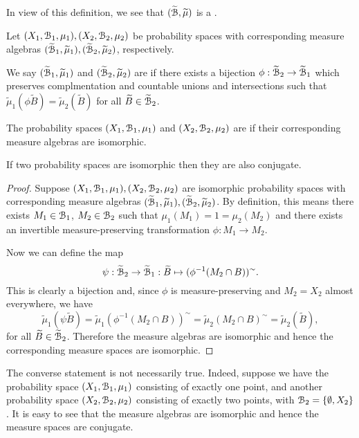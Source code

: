 In view of this definition, we see that $(\widetilde{\mathcal{B}}, \widetilde{\mu})$ is a .

\begin{definition}
	Let $(X_1, \mathcal{B}_1, \mu_1), (X_2, \mathcal{B}_2, \mu_2)$ be probability spaces with corresponding measure algebras $(\widetilde{\mathcal{B}}_1, \widetilde{\mu}_1), (\widetilde{\mathcal{B}}_2, \widetilde{\mu}_2)$, respectively.
	
	We say $(\widetilde{\mathcal{B}}_1, \widetilde{\mu}_1)$ and $(\widetilde{\mathcal{B}}_2, \widetilde{\mu}_2)$ are  if there exists a bijection $\phi : \widetilde{\mathcal{B}}_2 \to \widetilde{\mathcal{B}}_1$ which preserves complmentation and countable unions and intersections such that $\tilde{\mu}_1(\phi \tilde{B}) = \tilde{\mu}_2(\tilde{B})$ for all $\widetilde{B} \in \widetilde{\mathcal{B}}_2$.
	
	The probability spaces $(X_1, \mathcal{B}_1, \mu_1)$ and $(X_2, \mathcal{B}_2, \mu_2)$ are  if their corresponding measure algebras are isomorphic.
\end{definition}

\begin{proposition}
	If two probability spaces are isomorphic then they are also conjugate.
	\begin{proof}
		Suppose $(X_1, \mathcal{B}_1, \mu_1), (X_2, \mathcal{B}_2, \mu_2)$ are isomorphic probability spaces with corresponding measure algebras $(\widetilde{\mathcal{B}}_1, \widetilde{\mu}_1), (\widetilde{\mathcal{B}}_2, \widetilde{\mu}_2)$. By definition, this means there exists $M_1 \in \mathcal{B}_1$, $M_2 \in \mathcal{B}_2$ such that $\mu_1(M_1) = 1 = \mu_2(M_2)$ and there exists an invertible measure-preserving transformation $\phi: M_1 \to M_2$.
		
		Now we can define the map
		\[
			\psi : \widetilde{\mathcal{B}}_2 \to \widetilde{\mathcal{B}}_1 : \widetilde{B} \mapsto (\phi^{-1}(M_2 \cap B))^\sim.
		\]
		This is clearly a bijection and, since $\phi$ is measure-preserving and $M_2 = X_2$ almost everywhere, we have
		\[
			\tilde{\mu}_1(\psi\tilde{B}) = \tilde{\mu}_1(\phi^{-1}(M_2 \cap B))^\sim = \tilde{\mu}_2(M_2 \cap B)^\sim = \tilde{\mu}_2(\tilde{B}),
		\]
		for all $\widetilde{B} \in \widetilde{\mathcal{B}}_2$. Therefore the measure algebras are isomorphic and hence the corresponding measure spaces are isomorphic.
	\end{proof}
\end{proposition}

The converse statement is not necessarily true. Indeed, suppose we have the probability space $(X_1, \mathcal{B}_1, \mu_1)$ consisting of exactly one point, and another probability space $(X_2, \mathcal{B}_2, \mu_2)$ consisting of exactly two points, with $\mathcal{B}_2 = \{\emptyset, X_2\}$. It is easy to see that the measure algebras are isomorphic and hence the measure spaces are conjugate.

